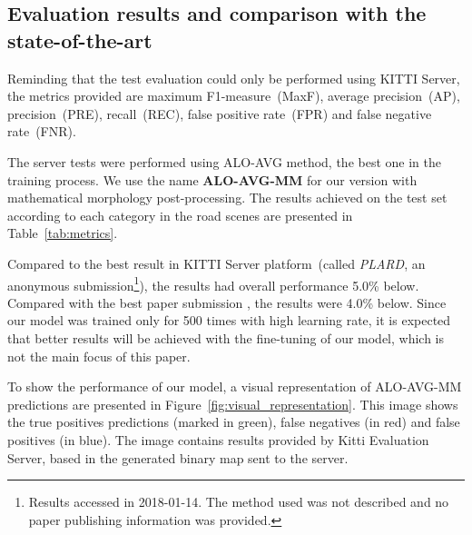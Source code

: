 \subsection{Evaluation results and comparison with the state-of-the-art}

Reminding that the test evaluation could only be performed using KITTI Server, the metrics provided are maximum F1-measure~(MaxF), average precision~(AP), precision~(PRE), recall~(REC), false positive rate~(FPR) and false negative rate~(FNR). 

The server tests were performed using ALO-AVG method, the best one in the training process. We use the name \textbf{ALO-AVG-MM} for our version with mathematical morphology post-processing. The results achieved on the test set according to each category in the road scenes are presented in Table~\ref{tab:metrics}. 

Compared to the best result in KITTI Server platform~(called \textit{PLARD}, an anonymous submission\footnote{Results accessed in 2018-01-14. The method used was not described and no paper publishing information was provided.}), the results had overall performance 5.0\% below. Compared with the best paper submission \cite{Caltagirone2018}, the results were 4.0\% below. Since our model was trained only for 500 times with high learning rate, it is expected that better results will be achieved with the fine-tuning of our model, which is not the main focus of this paper. %



To show the performance of our model, a visual representation of ALO-AVG-MM predictions are presented in Figure~\ref{fig:visual_representation}. This image shows the true positives predictions (marked in green), false negatives (in  red) and false positives (in blue). The image contains results provided by Kitti Evaluation Server, based in the generated binary map sent to the server.

